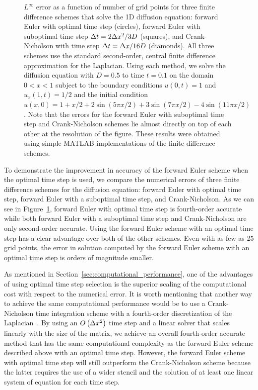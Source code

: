 \documentclass[oneeqnum,onefignum,onetabnum,onethmnum]{siamltex}
\begin{document}
\begin{figure}[tb]
\begin{center}
\caption{$L^\infty$ error as a function of number of grid points for three 
finite difference schemes that solve the 1D diffusion equation: forward Euler 
with optimal time step (circles), forward Euler with suboptimal time step
$\Delta t = 2\Delta x^2/3D$ (squares), and Crank-Nicholson with time step 
$\Delta t = \Delta x/16 D$ (diamonds).  All three schemes use the standard second-order, 
central finite difference approximation for the Laplacian.  Using each method, 
we solve the diffusion equation with $D = 0.5$ to time $t = 0.1$ on the 
domain $0 < x < 1$ subject to the boundary conditions $u(0,t) = 1$ and 
$u_x(1,t) = 1/2$ and the initial condition
$u(x,0) = 1 + x/2 + 2 \sin(5 \pi x/2) + 3 \sin(7 \pi x/2) 
- 4 \sin(11 \pi x/2)$.  
Note that the errors for the forward Euler with suboptimal time 
step and Crank-Nicholson schemes lie almost directly on top of each other
at the resolution of the figure.
These results were obtained using simple MATLAB implementations of the 
finite difference schemes.
}
\label{fig:diffusion_eqn_1d_no_src_error}
\end{center}
\end{figure}

To demonstrate the improvement in accuracy of the forward Euler scheme when 
the optimal time step is used, we compare the numerical errors of three finite 
difference schemes for the diffusion equation: forward Euler with optimal
time step, forward Euler with a suboptimal time step, and Crank-Nicholson.  
As we can see in Figure~\ref{fig:diffusion_eqn_1d_no_src_error}, forward 
Euler with optimal time step is fourth-order accurate while both forward Euler 
with a suboptimal time step and Crank-Nicholson are only second-order 
accurate.  Using the forward Euler scheme with an optimal time step has a clear 
advantage over both of the other schemes.  Even with as few as 25 grid 
points, the error in solution computed by the forward Euler scheme with an 
optimal time step is orders of magnitude smaller. 

As mentioned in Section~\ref{sec:computational_performance}, one of the 
advantages of using optimal time step selection is the superior scaling of 
the computational cost with respect to the numerical error.  It is worth 
mentioning that another way to achieve the same computational performance
would be to use a Crank-Nicholson time integration scheme with a fourth-order 
discretization of the Laplacian~\cite{gibou_2005}.  By using an 
$O\left(\Delta x^2 \right)$ time step and a linear solver that scales linearly 
with the size of the matrix, we achieve an overall fourth-order accurate 
method that has the same computational complexity as the forward Euler scheme
described above with an optimal time step.  However, the forward Euler scheme 
with optimal time step will still outperform the Crank-Nicholson scheme 
because the latter requires the use of a wider stencil and the solution of 
at least one linear system of equation for each time step. 
\end{document}
